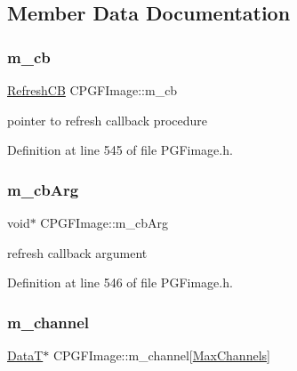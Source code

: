 \begin{DoxyCode}{0}
\end{DoxyCode}


\subsection{Member Data Documentation}
\mbox{\label{classCPGFImage_ac262a389df92493dfca63b2f1f06fe78}} 
\subsubsection{\texorpdfstring{m\_cb}{m\_cb}}
{\footnotesize\ttfamily \mbox{\hyperlink{PGFtypes_8h_a80e898ce785fbd6fb0dfcc5903be79c2}{Refresh\+CB}} C\+P\+G\+F\+Image\+::m\+\_\+cb\hspace{0.3cm}{\ttfamily [private]}}



pointer to refresh callback procedure 



Definition at line 545 of file P\+G\+Fimage.\+h.

\mbox{\label{classCPGFImage_a45861a83c95188610063233149187f3c}} 
\subsubsection{\texorpdfstring{m\_cbArg}{m\_cbArg}}
{\footnotesize\ttfamily void$\ast$ C\+P\+G\+F\+Image\+::m\+\_\+cb\+Arg\hspace{0.3cm}{\ttfamily [private]}}



refresh callback argument 



Definition at line 546 of file P\+G\+Fimage.\+h.

\mbox{\label{classCPGFImage_a36f7f20b38a9cb3a9c88032f5f886345}} 
\subsubsection{\texorpdfstring{m\_channel}{m\_channel}}
{\footnotesize\ttfamily \mbox{\hyperlink{PGFtypes_8h_acb1ee3f52ccfad782dcaa0abd79e5d05}{DataT}}$\ast$ C\+P\+G\+F\+Image\+::m\+\_\+channel\mbox{[}\mbox{\hyperlink{PGFtypes_8h_a94219182f88d4dbed1021ed04db75e41}{Max\+Channels}}\mbox{]}\hspace{0.3cm}{\ttfamily [protected]}}



